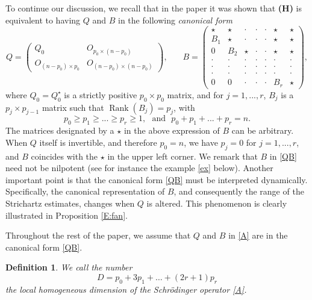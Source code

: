\documentclass[11pt,letter]{amsart}
\numberwithin{equation}{section}
\newtheorem{definition}[theorem]{Definition}
\numberwithin{equation}{section}
\begin{document}
\noindent To continue our discussion, we recall that in the paper \cite{LP} it was shown that  \textbf{(H)} is equivalent to having $Q$ and $B$ in the following \emph{canonical form}
\begin{equation}\label{QB}
Q = \begin{pmatrix} Q_0 & O_{p_0\times{(n-p_0)}}
\\
O_{{(n-p_0)}\times p_0} & O_{(n-p_0)\times (n-p_0)}\end{pmatrix},
\ \ \ \ \ \ \ \ 
B = \begin{pmatrix} \star & \star & \cdot & \cdot & \cdot & \star & \star
\\
B_1 & \star & \cdot & \cdot & \cdot & \star & \star
\\
0 & B_2 & \star & \cdot & \cdot &  \star & \star
\\
\cdot & \cdot & \cdot & \cdot & \cdot & \cdot & \cdot
\\
\cdot & \cdot & \cdot & \cdot & \cdot & \cdot & \cdot
\\
\cdot & \cdot & \cdot & \cdot & \cdot & \cdot & \cdot
\\
0 & 0 & \cdot & \cdot & \cdot &  B_r & \star
\end{pmatrix},
\end{equation}
where $Q_0 = Q_0^\star$ is a strictly positive $p_0\times p_0$ matrix, and for $j=1,...,r$, $B_j$ is a $ p_j \times p_{j-1}$ matrix such that $\operatorname{Rank}(B_j) = p_j$,  with 
\[
p_0\ge p_1\ge ... \ge p_r \ge 1,\ \ \  \text{and}\ \ \ p_0 + p_1 + ... + p_r = n.
\]
The matrices designated by a $\star$ in the above expression of $B$ can be arbitrary. When $Q$ itself is invertible, and therefore $p_0 = n$,  we have $p_j = 0$ for $j=1,...,r$, and $B$ coincides with the $\star$ in the upper left corner. We remark that $B$ in \eqref{QB} need not be nilpotent (see for instance the example \eqref{ex} below). Another important point is that the canonical form \eqref{QB} must be interpreted dynamically. Specifically, the canonical representation of $B$, and consequently the range of the Strichartz estimates, changes when $Q$ is altered. This phenomenon is clearly illustrated in Proposition \ref{E:fan}.


\medskip


\noindent Throughout the rest of the paper, we assume that $Q$ and $B$ in \eqref{A} are in the canonical form \eqref{QB}. 

\medskip

\begin{definition}\label{D:hd}
We call the number  
\begin{equation}\label{hd}
D = p_0+3p_1+\ldots+(2r+1)p_r
\end{equation}
the \emph{local homogeneous dimension} of the Schr\"odinger operator \eqref{A}. 
\end{definition}
\end{document}
